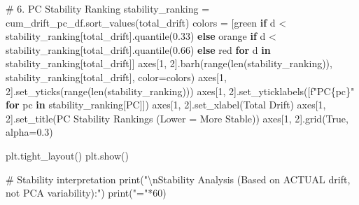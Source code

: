 \documentclass[
  letterpaper,
  DIV=11,
  numbers=noendperiod]{scrartcl}
\newenvironment{Shaded}{\begin{snugshade}}{\end{snugshade}}
\newcommand{\BuiltInTok}[1]{\textcolor[rgb]{0.00,0.23,0.31}{#1}}
\newcommand{\CharTok}[1]{\textcolor[rgb]{0.13,0.47,0.30}{#1}}
\newcommand{\CommentTok}[1]{\textcolor[rgb]{0.37,0.37,0.37}{#1}}
\newcommand{\ControlFlowTok}[1]{\textcolor[rgb]{0.00,0.23,0.31}{\textbf{#1}}}
\newcommand{\DecValTok}[1]{\textcolor[rgb]{0.68,0.00,0.00}{#1}}
\newcommand{\FloatTok}[1]{\textcolor[rgb]{0.68,0.00,0.00}{#1}}
\newcommand{\KeywordTok}[1]{\textcolor[rgb]{0.00,0.23,0.31}{\textbf{#1}}}
\newcommand{\NormalTok}[1]{\textcolor[rgb]{0.00,0.23,0.31}{#1}}
\newcommand{\OperatorTok}[1]{\textcolor[rgb]{0.37,0.37,0.37}{#1}}
\newcommand{\SpecialCharTok}[1]{\textcolor[rgb]{0.37,0.37,0.37}{#1}}
\newcommand{\SpecialStringTok}[1]{\textcolor[rgb]{0.13,0.47,0.30}{#1}}
\newcommand{\StringTok}[1]{\textcolor[rgb]{0.13,0.47,0.30}{#1}}
\newcommand{\VariableTok}[1]{\textcolor[rgb]{0.07,0.07,0.07}{#1}}
\renewenvironment{Shaded}{%
  \begin{tcolorbox}[%
    enhanced,%
    colback=codebg,%
    colframe=codebg,%
    borderline west={3pt}{0pt}{sectionblue},%
    fontupper=\small\ttfamily,%
    boxrule=0pt,%
    arc=0pt,%
    boxsep=5pt,%
    left=2mm,%
    right=2mm,%
    top=2mm,%
    bottom=2mm%
  ]%
}{%
  \end{tcolorbox}%
}
\begin{document}
\begin{Shaded}
\begin{Highlighting}[]
\CommentTok{\# 6. PC Stability Ranking}
\NormalTok{stability\_ranking }\OperatorTok{=}\NormalTok{ cum\_drift\_pc\_df.sort\_values(}\StringTok{\textquotesingle{}total\_drift\textquotesingle{}}\NormalTok{)}
\NormalTok{colors }\OperatorTok{=}\NormalTok{ [}\StringTok{\textquotesingle{}green\textquotesingle{}} \ControlFlowTok{if}\NormalTok{ d }\OperatorTok{\textless{}}\NormalTok{ stability\_ranking[}\StringTok{\textquotesingle{}total\_drift\textquotesingle{}}\NormalTok{].quantile(}\FloatTok{0.33}\NormalTok{) }\ControlFlowTok{else} 
          \StringTok{\textquotesingle{}orange\textquotesingle{}} \ControlFlowTok{if}\NormalTok{ d }\OperatorTok{\textless{}}\NormalTok{ stability\_ranking[}\StringTok{\textquotesingle{}total\_drift\textquotesingle{}}\NormalTok{].quantile(}\FloatTok{0.66}\NormalTok{) }\ControlFlowTok{else} \StringTok{\textquotesingle{}red\textquotesingle{}} 
          \ControlFlowTok{for}\NormalTok{ d }\KeywordTok{in}\NormalTok{ stability\_ranking[}\StringTok{\textquotesingle{}total\_drift\textquotesingle{}}\NormalTok{]]}
\NormalTok{axes[}\DecValTok{1}\NormalTok{, }\DecValTok{2}\NormalTok{].barh(}\BuiltInTok{range}\NormalTok{(}\BuiltInTok{len}\NormalTok{(stability\_ranking)), stability\_ranking[}\StringTok{\textquotesingle{}total\_drift\textquotesingle{}}\NormalTok{], color}\OperatorTok{=}\NormalTok{colors)}
\NormalTok{axes[}\DecValTok{1}\NormalTok{, }\DecValTok{2}\NormalTok{].set\_yticks(}\BuiltInTok{range}\NormalTok{(}\BuiltInTok{len}\NormalTok{(stability\_ranking)))}
\NormalTok{axes[}\DecValTok{1}\NormalTok{, }\DecValTok{2}\NormalTok{].set\_yticklabels([}\SpecialStringTok{f"PC}\SpecialCharTok{\{}\NormalTok{pc}\SpecialCharTok{\}}\SpecialStringTok{"} \ControlFlowTok{for}\NormalTok{ pc }\KeywordTok{in}\NormalTok{ stability\_ranking[}\StringTok{\textquotesingle{}PC\textquotesingle{}}\NormalTok{]])}
\NormalTok{axes[}\DecValTok{1}\NormalTok{, }\DecValTok{2}\NormalTok{].set\_xlabel(}\StringTok{\textquotesingle{}Total Drift\textquotesingle{}}\NormalTok{)}
\NormalTok{axes[}\DecValTok{1}\NormalTok{, }\DecValTok{2}\NormalTok{].set\_title(}\StringTok{\textquotesingle{}PC Stability Rankings (Lower = More Stable)\textquotesingle{}}\NormalTok{)}
\NormalTok{axes[}\DecValTok{1}\NormalTok{, }\DecValTok{2}\NormalTok{].grid(}\VariableTok{True}\NormalTok{, alpha}\OperatorTok{=}\FloatTok{0.3}\NormalTok{)}

\NormalTok{plt.tight\_layout()}
\NormalTok{plt.show()}

\CommentTok{\# Stability interpretation}
\BuiltInTok{print}\NormalTok{(}\StringTok{"}\CharTok{\textbackslash{}n}\StringTok{Stability Analysis (Based on ACTUAL drift, not PCA variability):"}\NormalTok{)}
\BuiltInTok{print}\NormalTok{(}\StringTok{"="}\OperatorTok{*}\DecValTok{60}\NormalTok{)}


\end{Highlighting}
\end{Shaded}
\end{document}
